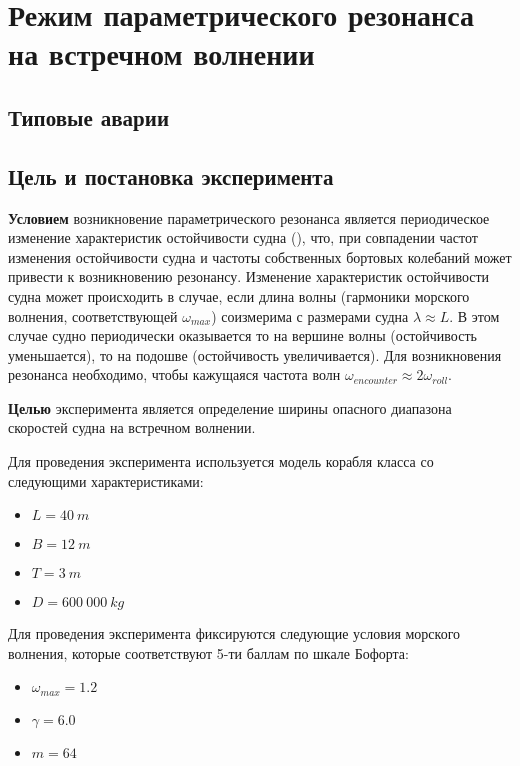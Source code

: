 \section{Режим параметрического резонанса на встречном волнении}

\subsection{Типовые аварии}


\subsection{Цель и постановка эксперимента}

\textbf{Условием} возникновение параметрического резонанса является периодическое изменение характеристик остойчивости судна (), что, при совпадении частот изменения остойчивости судна и частоты собственных бортовых колебаний может привести к возникновению резонансу.
Изменение характеристик остойчивости судна может происходить в случае, если длина волны (гармоники морского волнения, соответствующей $\omega_{max}$) соизмерима с размерами судна $\lambda \approx L$. В этом случае судно периодически оказывается то на вершине волны (остойчивость уменьшается), то на подошве (остойчивость увеличивается). Для возникновения резонанса необходимо, чтобы кажущаяся частота волн $\omega_{encounter} \approx 2\omega_{roll}$.

\textbf{Целью} эксперимента является определение ширины опасного диапазона скоростей судна на встречном волнении.

Для проведения эксперимента используется модель корабля класса  со следующими характеристиками:
\begin{itemize}
	\item	$L = 40\ m$
	\item	$B = 12\ m$
	\item	$T = 3\ m$
	\item	$D = 600\ 000\ kg$
\end{itemize}

Для проведения эксперимента фиксируются следующие условия морского волнения, которые соответствуют 5-ти баллам по шкале Бофорта:
\begin{itemize}
	\item	$\omega_{max} = 1.2$
	\item	$\gamma = 6.0$
	\item	$m = 64$
\end{itemize}

